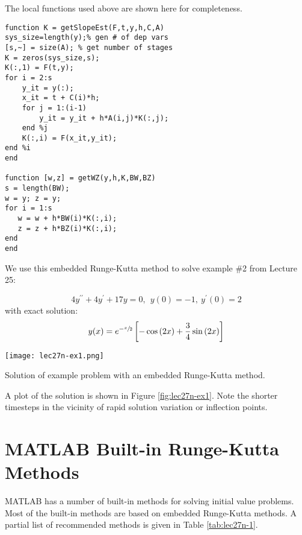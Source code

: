 The local functions used above are shown here for completeness.
\begin{lstlisting}[style=myMatlab,name=lec27n-1]
function K = getSlopeEst(F,t,y,h,C,A)
sys_size=length(y);% gen # of dep vars
[s,~] = size(A); % get number of stages
K = zeros(sys_size,s);
K(:,1) = F(t,y);
for i = 2:s
    y_it = y(:);
    x_it = t + C(i)*h;
    for j = 1:(i-1)
        y_it = y_it + h*A(i,j)*K(:,j);
    end %j    
    K(:,i) = F(x_it,y_it);
end %i
end

function [w,z] = getWZ(y,h,K,BW,BZ)
s = length(BW);
w = y; z = y;
for i = 1:s
   w = w + h*BW(i)*K(:,i);
   z = z + h*BZ(i)*K(:,i);
end
end
\end{lstlisting}
We use this embedded Runge-Kutta method to solve example \#2 from Lecture 25:

\begin{equation*}
4y^{\prime \prime}+4y^{\prime} + 17y=0, \ \ y(0)=-1, \ y^{\prime}(0)=2
\end{equation*}
with exact solution:
\begin{equation*}
y(x)=e^{-\sfrac{x}{2}}\left[-\cos{(2x)}+\frac{3}{4}\sin{(2x)} \right]
\end{equation*}
\begin{marginfigure}
\texttt{[image: lec27n-ex1.png]}
\caption{Solution of example problem with an embedded Runge-Kutta method.}
\label{fig:lec27n-ex1}
\end{marginfigure}
A plot of the solution is shown in Figure \ref{fig:lec27n-ex1}.  Note the shorter timesteps in the vicinity of rapid solution variation or inflection points.

\section{MATLAB Built-in Runge-Kutta Methods}

MATLAB has a number of built-in methods for solving initial value problems.  Most of the built-in methods are based on embedded Runge-Kutta methods.  A partial list of recommended methods is given in Table \ref{tab:lec27n-1}.

